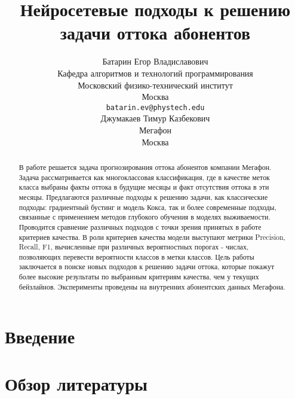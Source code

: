 \documentclass{article}
\title{Нейросетевые подходы к решению задачи оттока абонентов}
\author{ Батарин Егор Владиславович \\
	Кафедра алгоритмов и технологий программирования \\
	Московский физико-технический институт\\
	Москва \\
	\texttt{batarin.ev@phystech.edu} \\
	\And
	Джумакаев Тимур Казбекович \\
	Мегафон\\
	Москва\\
}
\date{}
\begin{document}
\maketitle

\begin{abstract}

В работе решается задача прогнозирования оттока абонентов компании Мегафон. Задача рассматривается как многоклассовая классификация, где в качестве меток класса выбраны факты оттока в будущие месяцы и факт отсутствия оттока в эти месяцы. Предлагаются различные подходы к решению задачи, как классические подходы: градиентный бустинг и модель Кокса, так и более современные подходы, связанные с применением методов глубокого обучения в моделях выживаемости. Проводится сравнение различных подходов с точки зрения принятых в работе критериев качества. В роли критериев качества модели выступают метрики Precision, Recall, F1, вычисленные при различных вероятностных порогах - числах, позволяющих перевести вероятности классов в метки классов. Цель работы заключается в поиске новых подходов к решению задачи оттока, которые покажут более высокие результаты по выбранным критериям качества, чем у текущих бейзлайнов. Эксперименты проведены на внутренних абонентских данных Мегафона.   

\end{abstract}



\section{Введение}

\section{Обзор литературы}









\end{document}
